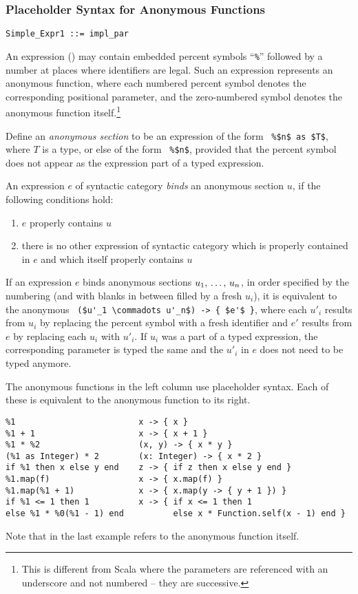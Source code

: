\subsubsection{Placeholder Syntax for Anonymous Functions}
\label{sec:placeholder-functions}

\syntax\begin{lstlisting}
Simple_Expr1 ::= impl_par
\end{lstlisting}

An expression () may contain embedded percent symbols ``\lstinline!%!'' followed by a number at places where identifiers are legal. Such an expression represents an anonymous function, where each numbered percent symbol denotes the corresponding positional parameter, and the zero-numbered symbol denotes the anonymous function itself.\footnote{This is different from Scala where the parameters are referenced with an underscore and not numbered -- they are successive.}

Define an {\em anonymous section} to be an expression of the form ~\lstinline!%$n$ as $T$!, where $T$ is a type, or else of the form ~\lstinline!%$n$!, provided that the percent symbol does not appear as the expression part of a typed expression. 

An expression $e$ of syntactic category  {\em binds} an anonymous section $u$, if the following conditions hold:
\begin{enumerate}
  \item $e$ properly contains $u$
  \item there is no other expression of syntactic category  which is properly contained in $e$ and which itself properly contains $u$
\end{enumerate}

If an expression $e$ binds anonymous sections $u_1 ,\, \ldots ,\, u_n$, in order specified by the numbering (and with blanks in between filled by a fresh $u_i$), it is equivalent to the anonymous ~\lstinline!($u'_1 \commadots u'_n$) -> { $e'$ }!, where each $u'_i$ results from $u_i$ by replacing the percent symbol with a fresh identifier and $e'$ results from $e$ by replacing each $u_i$ with $u'_i$. If $u_i$ was a part of a typed expression, the corresponding parameter is typed the same and the $u'_i$ in $e$ does not need to be typed anymore. 

\example The anonymous functions in the left column use placeholder syntax. Each of these is equivalent to the anonymous function to its right. 
\begin{lstlisting}
%1                         x -> { x }
%1 + 1                     x -> { x + 1 }
%1 * %2                    (x, y) -> { x * y }
(%1 as Integer) * 2        (x: Integer) -> { x * 2 }
if %1 then x else y end    z -> { if z then x else y end }
%1.map(f)                  x -> { x.map(f) }
%1.map(%1 + 1)             x -> { x.map(y -> { y + 1 }) }
if %1 <= 1 then 1          x -> { if x <= 1 then 1 
else %1 * %0(%1 - 1) end          else x * Function.self(x - 1) end }
\end{lstlisting}
Note that  in the last example refers to the anonymous function itself. 




